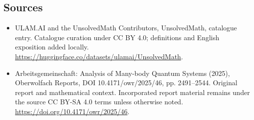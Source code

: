 \documentclass[11pt]{article}
\begin{document}
\subsection{Sources}
\begin{itemize}
\item[\hypertarget{source:statement:1}{S1}] ULAM.AI and the UnsolvedMath Contributors, UnsolvedMath, catalogue entry. Catalogue curation under CC BY 4.0; definitions and English exposition added locally.
\url{https://huggingface.co/datasets/ulamai/UnsolvedMath}.
\item[\hypertarget{source:statement:2}{S2}] Arbeitsgemeinschaft: Analysis of Many-body Quantum Systems (2025), Oberwolfach Reports, DOI 10.4171/owr/2025/46, pp. 2491--2544. Original report and mathematical context. Incorporated report material remains under the source CC BY-SA 4.0 terms unless otherwise noted.
\url{https://doi.org/10.4171/owr/2025/46}.
\end{itemize}
\label{end:statement}
\end{document}
